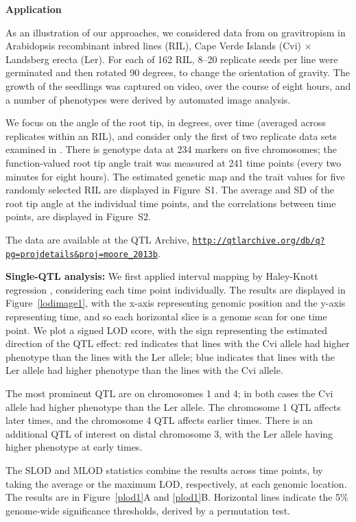 \documentclass[12pt,letterpaper]{article}
\begin{document}
\centerline{\sffamily \textbf{Application}}

As an illustration of our approaches, we considered data from
\citet{Moore2013} on gravitropism in Arabidopsis recombinant inbred
lines (RIL), Cape Verde Islands (Cvi) $\times$ Landsberg erecta (Ler).
For each of 162 RIL, 8--20 replicate seeds per line were germinated and then
rotated 90 degrees, to change the orientation of gravity. The growth
of the seedlings was captured on video, over the course of eight
hours, and a number of phenotypes were derived by automated image
analysis.

We focus on the angle of the root tip, in degrees, over time (averaged
across replicates within an RIL), and consider only the first of
two replicate data sets examined in \citet{Moore2013}. There is
genotype data at 234 markers on five chromosomes; the function-valued
root tip angle trait was measured at 241 time points (every two minutes
for eight hours). The estimated genetic map and the trait values for
five randomly selected RIL are displayed in Figure~S1. The average and
SD of the root tip angle at the individual time points, and the correlations between time
points, are displayed in Figure~S2.

The data are available at the QTL Archive,
\href{http://qtlarchive.org/db/q?pg=projdetails&proj=moore_2013b}{
\tt http://qtlarchive.org/db/q?pg=projdetails\&proj=moore\_2013b}.

\textbf{Single-QTL analysis:}
We first applied interval mapping by Haley-Knott regression
\citep{Haley1992}, considering each time point individually.
The results are displayed in Figure~\ref{lodimage1}, with the x-axis
representing genomic position and the y-axis representing time, and so
each horizontal slice is a genome scan for one time point. We plot a
signed LOD score, with the sign representing the estimated direction
of the QTL effect: red indicates that lines with the Cvi allele had higher
phenotype than the lines with the Ler allele; blue indicates that
lines with the Ler allele had higher phenotype than the lines with the
Cvi allele.

The most prominent QTL are on chromosomes 1 and 4; in both cases the
Cvi allele had higher phenotype than the Ler allele.  The chromosome
1 QTL affects later times, and the chromosome 4 QTL affects earlier
times. There is an additional QTL of interest on distal chromosome 3,
with the Ler allele having higher phenotype at early times.

The SLOD and MLOD statistics combine the results across time points,
by taking the average or the maximum LOD, respectively, at each genomic
location. The results are in Figure~\ref{plod1}A and \ref{plod1}B. Horizontal lines
indicate the 5\% genome-wide significance thresholds, derived by a permutation test.
\end{document}
